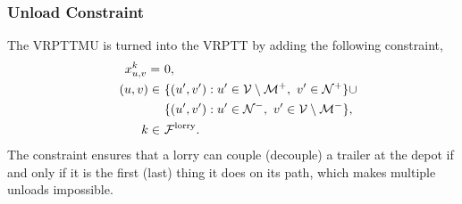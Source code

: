 %
%







\subsubsection{Unload Constraint}
The VRPTTMU is turned into the VRPTT by adding the following constraint,
\begin{align}
  \label{con:extra}
  x^{k}_{u,v} = \ &  0, \\
  \quad (u,v) \in \  & \{  (u',v') : u' \in \mathcal V \setminus  \mathcal M^+  , \ v' \in \mathcal N^+  \} \cup \notag \\
   & \{  (u',v') : u' \in \mathcal N^- , \ v'  \in \mathcal V \setminus  \mathcal  M^-   \} ,\notag \\
  \ k \in \ & \mathcal{F}^{\rm lorry} . \notag
\end{align}
The constraint ensures that a lorry can couple (decouple) a trailer at the depot if and only if it is the first (last) thing it does on its path, which makes multiple unloads impossible. \\

